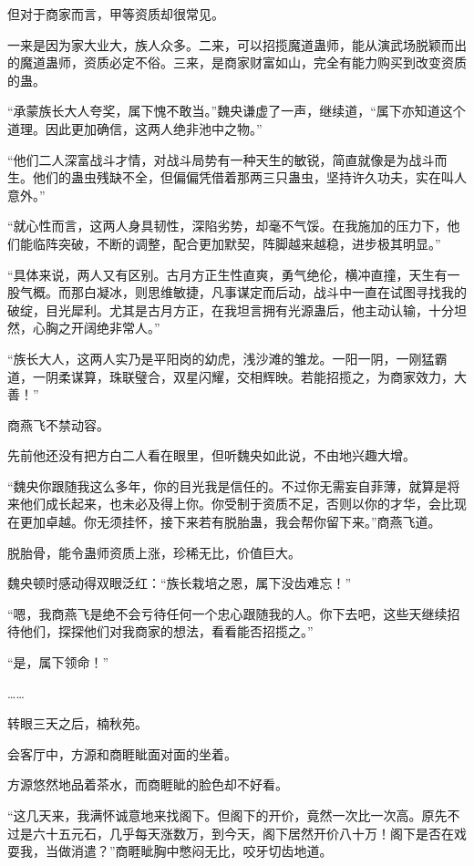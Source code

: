 \begin{this_body}
但对于商家而言，甲等资质却很常见。

一来是因为家大业大，族人众多。二来，可以招揽魔道蛊师，能从演武场脱颖而出的魔道蛊师，资质必定不俗。三来，是商家财富如山，完全有能力购买到改变资质的蛊。

“承蒙族长大人夸奖，属下愧不敢当。”魏央谦虚了一声，继续道，“属下亦知道这个道理。因此更加确信，这两人绝非池中之物。”

“他们二人深富战斗才情，对战斗局势有一种天生的敏锐，简直就像是为战斗而生。他们的蛊虫残缺不全，但偏偏凭借着那两三只蛊虫，坚持许久功夫，实在叫人意外。”

“就心性而言，这两人身具韧性，深陷劣势，却毫不气馁。在我施加的压力下，他们能临阵突破，不断的调整，配合更加默契，阵脚越来越稳，进步极其明显。”

“具体来说，两人又有区别。古月方正生性直爽，勇气绝伦，横冲直撞，天生有一股气概。而那白凝冰，则思维敏捷，凡事谋定而后动，战斗中一直在试图寻找我的破绽，目光犀利。尤其是古月方正，在我坦言拥有光源蛊后，他主动认输，十分坦然，心胸之开阔绝非常人。”

“族长大人，这两人实乃是平阳岗的幼虎，浅沙滩的雏龙。一阳一阴，一刚猛霸道，一阴柔谋算，珠联璧合，双星闪耀，交相辉映。若能招揽之，为商家效力，大善！”

商燕飞不禁动容。

先前他还没有把方白二人看在眼里，但听魏央如此说，不由地兴趣大增。

“魏央你跟随我这么多年，你的目光我是信任的。不过你无需妄自菲薄，就算是将来他们成长起来，也未必及得上你。你受制于资质不足，否则以你的才华，会比现在更加卓越。你无须挂怀，接下来若有脱胎蛊，我会帮你留下来。”商燕飞道。

脱胎骨，能令蛊师资质上涨，珍稀无比，价值巨大。

魏央顿时感动得双眼泛红：“族长栽培之恩，属下没齿难忘！”

“嗯，我商燕飞是绝不会亏待任何一个忠心跟随我的人。你下去吧，这些天继续招待他们，探探他们对我商家的想法，看看能否招揽之。”

“是，属下领命！”

……

转眼三天之后，楠秋苑。

会客厅中，方源和商睚眦面对面的坐着。

方源悠然地品着茶水，而商睚眦的脸色却不好看。

“这几天来，我满怀诚意地来找阁下。但阁下的开价，竟然一次比一次高。原先不过是六十五元石，几乎每天涨数万，到今天，阁下居然开价八十万！阁下是否在戏耍我，当做消遣？”商睚眦胸中憋闷无比，咬牙切齿地道。


\end{this_body}
